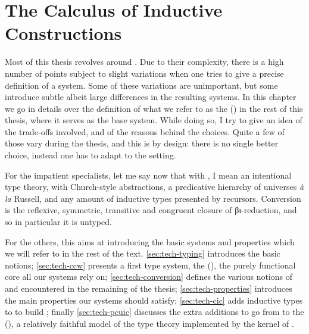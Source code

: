 \chapter{The Calculus of Inductive Constructions}
\label{chap:tech-intro}

\margintoc

Most of this thesis revolves around .
Due to their complexity, there is a high number of
points subject to slight variations
when one tries to give a precise definition of a system.
Some of these variations are unimportant, but some introduce subtle albeit large differences
in the resulting systems. In this chapter we go in details over
the definition of what we refer to as the
 () in the rest of this
thesis, where it serves as the base system.
While doing so, I try to give an idea of the trade-offs involved, and of the reasons
behind the choices. Quite a few of those vary during the thesis,
and this is by design: there is no single better choice,
instead one has to adapt to the setting.

For the impatient specialists, let me say now that with , I
mean an intentional type theory, with Church-style abstractions,
a predicative hierarchy of universes%
\textit{à la} Russell, and any amount of inductive types presented by recursors.
Conversion is the reflexive, symmetric, transitive and congruent
closure of βι-reduction, and so in particular it is untyped.

For the others, this  aims at introducing the basic
systems and properties which we will refer to in the rest of the text.
\cref{sec:tech-typing} introduces the basic notions;
\cref{sec:tech-ccw} presents a first type system,
the  (),
the purely functional core all our systems rely on;
\cref{sec:tech-conversion} defines the various notions of  and
 encountered in the remaining of the thesis;
\cref{sec:tech-properties} introduces the main properties our systems should satisfy;
\cref{sec:tech-cic} adds inductive types to  to build
; finally \cref{sec:tech-pcuic} discusses the extra additions to go from
 to the 
(), a relatively faithful model of the type theory implemented by the
kernel of .

